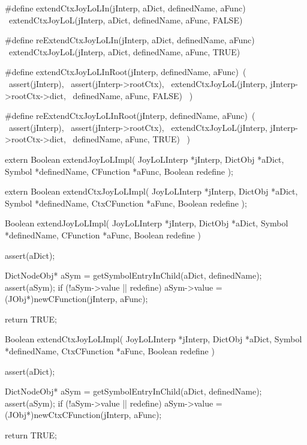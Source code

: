#define extendCtxJoyLoLIn(jInterp, aDict, definedName, aFunc) \
  extendCtxJoyLoL(jInterp, aDict, definedName, aFunc, FALSE)
  
#define reExtendCtxJoyLoLIn(jInterp, aDict, definedName, aFunc) \
  extendCtxJoyLoL(jInterp, aDict, definedName, aFunc, TRUE)
  
#define extendCtxJoyLoLInRoot(jInterp, definedName, aFunc)\
  (                                                       \
    assert(jInterp),                                      \
    assert(jInterp->rootCtx),                             \
    extendCtxJoyLoL(jInterp, jInterp->rootCtx->dict,      \
      definedName, aFunc, FALSE)                          \
  )
  
#define reExtendCtxJoyLoLInRoot(jInterp, definedName, aFunc)\
  (                                                         \
    assert(jInterp),                                        \
    assert(jInterp->rootCtx),                               \
    extendCtxJoyLoL(jInterp, jInterp->rootCtx->dict,        \
      definedName, aFunc, TRUE)                             \
  )
\stopCHeader

\setCHeaderStream{private}
\startCHeader
extern Boolean extendJoyLoLImpl(
  JoyLoLInterp *jInterp,
  DictObj      *aDict,
  Symbol       *definedName,
  CFunction    *aFunc,
  Boolean       redefine
);

extern Boolean extendCtxJoyLoLImpl(
  JoyLoLInterp *jInterp,
  DictObj      *aDict,
  Symbol       *definedName,
  CtxCFunction *aFunc,
  Boolean       redefine
);
\stopCHeader
{}

\startCCode
Boolean extendJoyLoLImpl(
  JoyLoLInterp *jInterp,
  DictObj      *aDict,
  Symbol       *definedName,
  CFunction    *aFunc,
  Boolean       redefine
) {
  assert(aDict);

  DictNodeObj* aSym = getSymbolEntryInChild(aDict, definedName);
  assert(aSym);
  if (!aSym->value || redefine) {
    aSym->value =
      (JObj*)newCFunction(jInterp, aFunc);
  }

  return TRUE;
}

Boolean extendCtxJoyLoLImpl(
  JoyLoLInterp *jInterp,
  DictObj      *aDict,
  Symbol       *definedName,
  CtxCFunction *aFunc,
  Boolean       redefine
) {
  assert(aDict);

  DictNodeObj* aSym = getSymbolEntryInChild(aDict, definedName);
  assert(aSym);
  if (!aSym->value || redefine) {
    aSym->value =
      (JObj*)newCtxCFunction(jInterp, aFunc);
  }

  return TRUE;
}
\stopCCode


